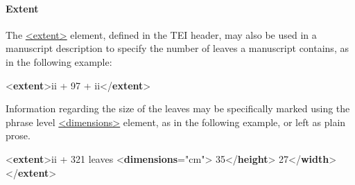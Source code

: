 \paragraph[{Extent}]{Extent}\label{msph1ext}\par
The \hyperref[TEI.extent]{<extent>} element, defined in the TEI header, may also be used in a manuscript description to specify the number of leaves a manuscript contains, as in the following example: \par\bgroup{}\exampleFont \begin{shaded}\noindent\mbox{}{<\textbf{extent}>}ii + 97 + ii{</\textbf{extent}>}\end{shaded}\egroup\par \noindent  Information regarding the size of the leaves may be specifically marked using the phrase level \hyperref[TEI.dimensions]{<dimensions>} element, as in the following example, or left as plain prose. \par\bgroup{}\exampleFont \begin{shaded}\noindent\mbox{}{<\textbf{extent}>}ii + 321 leaves {<\textbf{dimensions}\hspace*{1em}{unit}="{cm}">}\mbox{}\newline 
\hspace*{1em}35{</\textbf{height}>}\mbox{}\newline 
\hspace*{1em}27{</\textbf{width}>}\mbox{}\newline 
{}\mbox{}\newline 
{</\textbf{extent}>}\end{shaded}\egroup\par \par
